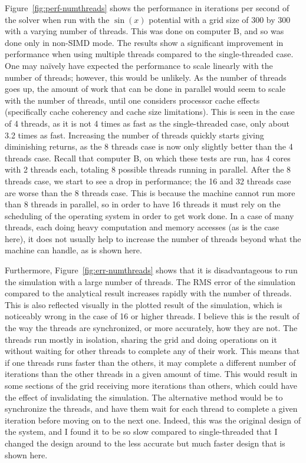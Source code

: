 Figure~\ref{fig:perf-numthreads} shows the performance in iterations per second of the solver when run
with the $\sin(x)$ potential with a grid size of 300 by 300 with a varying number of threads. This was done on computer B, and so was done
only in non-SIMD mode. The results show a significant improvement in performance when using multiple threads
compared to the single-threaded case. One may na\"{i}vely have expected the performance to scale linearly
with the number of threads; however, this would be unlikely. As the number of threads goes up, the amount
of work that can be done in parallel would seem to scale with the number of threads, until one considers processor cache effects (specifically
cache coherency and cache size limitations). This is seen in the case of 4 threads, as it is not 4 times as fast as
the single-threaded case, only about 3.2 times as fast. Increasing the number of threads quickly starts giving diminishing
returns, as the 8 threads case is now only slightly better than the 4 threads case. Recall that computer B, on which these
tests are run, has 4 cores with 2 threads each, totaling 8 possible threads running in parallel. After the 8 threads case,
we start to see a drop in performance; the 16 and 32 threads case are worse than the 8 threads case. This is because
the machine cannot run more than 8 threads in parallel, so in order to have 16 threads it must rely on the scheduling
of the operating system in order to get work done. In a case of many threads, each doing heavy computation and memory accesses
(as is the case here), it does not usually help to increase the number of threads beyond what the machine can handle,
as is shown here.



Furthermore, Figure~\ref{fig:err-numthreads} shows that it is disadvantageous to run the simulation with
a large number of threads. The RMS error of the simulation compared to the analytical result increases
rapidly with the number of threads. This is also reflected visually in the plotted result of the simulation, which is
noticeably wrong in the case of 16 or higher threads. I believe this is the result of the way the threads
are synchronized, or more accurately, how they are not. The threads run mostly in isolation, sharing the
grid and doing operations on it without waiting for other threads to complete any of their work. This means
that if one threads runs faster than the others, it may complete a different number of iterations than the other
threads in a given amount of time. This would result in some sections of the grid receiving more iterations
than others, which could have the effect of invalidating the simulation. The alternative method would be
to synchronize the threads, and have them wait for each thread to complete a given iteration before moving on
to the next one. Indeed, this was the original design of the system, and I found it to be so slow compared to
single-threaded that I changed the design around to the less accurate but much faster design that is shown here.



